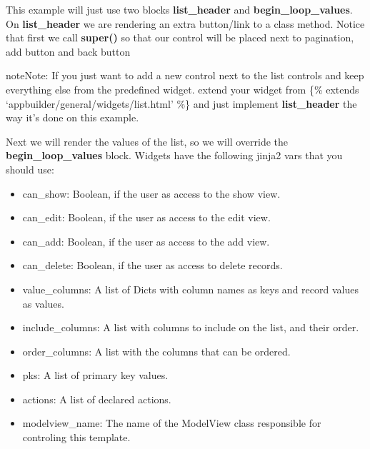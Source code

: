 \documentclass[letterpaper,10pt,english]{sphinxmanual}
\begin{document}
This example will just use two blocks \textbf{list\_header} and \textbf{begin\_loop\_values}.
On \textbf{list\_header} we are rendering an extra button/link to a class method.
Notice that first we call \textbf{super()} so that our control will be placed next to
pagination, add button and back button

\begin{notice}{note}{Note:}
If you just want to add a new control next to the list controls and keep everything else
from the predefined widget. extend your widget from \{\% extends `appbuilder/general/widgets/list.html' \%\}
and just implement \textbf{list\_header} the way it's done on this example.
\end{notice}

Next we will render the values of the list, so we will override the \textbf{begin\_loop\_values}
block. Widgets have the following jinja2 vars that you should use:
\begin{itemize}
\item {} 
can\_show: Boolean, if the user as access to the show view.

\item {} 
can\_edit: Boolean, if the user as access to the edit view.

\item {} 
can\_add: Boolean, if the user as access to the add view.

\item {} 
can\_delete: Boolean, if the user as access to delete records.

\item {} 
value\_columns: A list of Dicts with column names as keys and record values as values.

\item {} 
include\_columns: A list with columns to include on the list, and their order.

\item {} 
order\_columns: A list with the columns that can be ordered.

\item {} 
pks: A list of primary key values.

\item {} 
actions: A list of declared actions.

\item {} 
modelview\_name: The name of the ModelView class responsible for controling this template.

\end{itemize}
\end{document}
